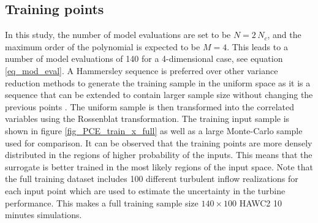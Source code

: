 \documentclass[preprint,12pt]{elsarticle}
\begin{document}

\begin{table}[!h]
\begin{centering}
\caption{Wind turbine model outputs.}
\label{tab_outs}
\end{centering}
\end{table}

\subsection{Training points}

In this study, the number of model evaluations are set to be $N=2\,N_c$, and the maximum order of the polynomial is expected to be $M=4$. This leads to a number of model evaluations of 140 for a 4-dimensional case, see equation \ref{eq_mod_eval}. %
A Hammersley sequence \cite{hammersley1960monte} is preferred over other variance reduction methods to generate the training sample in the uniform space as it is a sequence that can be extended to contain larger sample size without changing the previous points \cite{feinberg2015chaospy,hosder2007efficient}. The uniform sample is then transformed into the correlated variables using the Rossenblat transformation. The training input sample is shown in figure \ref{fig_PCE_train_x_full} as well as a large Monte-Carlo sample used for comparison. It can be observed that the training points are more densely distributed in the regions of higher probability of the inputs. This means that the surrogate is better trained in the most likely regions of the input space.  Note that the full training dataset includes 100 different turbulent inflow realizations for each input point which are used to estimate the uncertainty in the turbine performance. This makes a full training sample size $140 \times 100$ HAWC2 10 minutes simulations.
\end{document}
